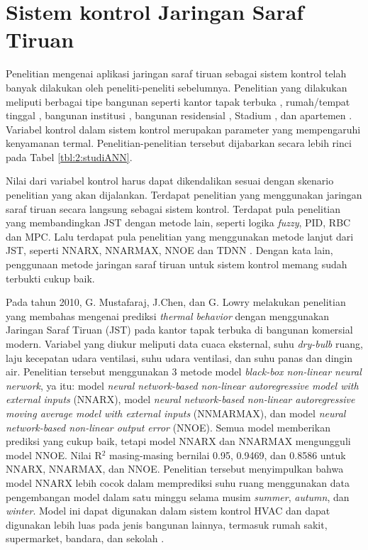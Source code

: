 \section{Sistem kontrol Jaringan Saraf Tiruan}

Penelitian mengenai aplikasi jaringan saraf tiruan sebagai sistem kontrol telah banyak dilakukan oleh peneliti-peneliti sebelumnya. Penelitian yang dilakukan meliputi berbagai tipe bangunan seperti kantor tapak terbuka \cite{article11}, rumah/tempat tinggal \cite{article12}\cite{article13}, bangunan institusi \cite{article14}, bangunan residensial \cite{article15}, Stadium \cite{article16}, dan apartemen \cite{article17}. Variabel kontrol dalam sistem kontrol merupakan parameter yang mempengaruhi kenyamanan termal. Penelitian-penelitian tersebut dijabarkan secara lebih rinci pada Tabel \ref{tbl:2:studiANN}.

Nilai dari variabel kontrol harus dapat dikendalikan sesuai dengan skenario penelitian yang akan dijalankan. Terdapat penelitian yang menggunakan jaringan saraf tiruan secara langsung sebagai sistem kontrol. Terdapat pula penelitian yang membandingkan JST dengan metode lain, seperti logika \textit{fuzzy}, PID, RBC dan MPC. Lalu terdapat pula penelitian yang menggunakan metode lanjut dari JST, seperti NNARX, NNARMAX, NNOE \cite{article11} dan TDNN \cite{article15}. Dengan kata lain, penggunaan metode jaringan saraf tiruan untuk sistem kontrol memang sudah terbukti cukup baik.

Pada tahun 2010, G. Mustafaraj, J.Chen, dan G. Lowry melakukan penelitian yang membahas mengenai prediksi \textit{thermal behavior} dengan menggunakan Jaringan Saraf Tiruan (JST) pada kantor tapak terbuka di bangunan komersial modern. Variabel yang diukur meliputi data cuaca eksternal, suhu \textit{dry-bulb} ruang, laju kecepatan udara ventilasi, suhu udara ventilasi, dan suhu panas dan dingin air. Penelitian tersebut menggunakan 3 metode model \textit{black-box non-linear neural nerwork}, ya	itu: model \textit{neural network-based non-linear autoregressive model with external inputs} (NNARX), model \textit{ neural network-based non-linear autoregressive moving average model with external inputs} (NNMARMAX), dan model \textit{neural network-based non-linear output error} (NNOE). Semua model memberikan prediksi yang cukup baik, tetapi model NNARX dan NNARMAX mengungguli model NNOE. Nilai R$^2$ masing-masing bernilai 0.95, 0.9469, dan 0.8586 untuk NNARX, NNARMAX, dan NNOE. Penelitian tersebut menyimpulkan bahwa model NNARX lebih cocok dalam memprediksi suhu ruang menggunakan data pengembangan model dalam satu minggu selama musim \textit{summer}, \textit{autumn}, dan \textit{winter}. Model ini dapat digunakan dalam sistem kontrol HVAC dan dapat digunakan lebih luas pada jenis bangunan lainnya, termasuk rumah sakit, supermarket, bandara, dan sekolah \cite{article11}.

